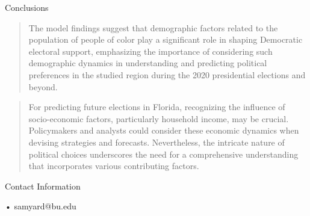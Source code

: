 \documentclass[xcolor=dvipsnames]{beamer}
\newlength{\onecolwid}
\begin{document}
\begin{frame}[t]
\begin{columns}[t]
\begin{column}{\onecolwid}

\begin{block}{Conclusions}\\
\begin{quote}
    The model findings suggest that demographic factors related to the population of people of color play a significant role in shaping Democratic electoral support, emphasizing the importance of considering such demographic dynamics in understanding and predicting political preferences in the studied region during the 2020 presidential elections and beyond.
\end{quote}
\newline
\begin{quote}
    For predicting future elections in Florida, recognizing the influence of socio-economic factors, particularly household income, may be crucial. Policymakers and analysts could consider these economic dynamics when devising strategies and forecasts. Nevertheless, the intricate nature of political choices underscores the need for a comprehensive understanding that incorporates various contributing factors.
\end{quote}

\end{block}





\begin{alertblock}{Contact Information}

 • samyard@bu.edu

\end{alertblock}


\end{column} %

\end{columns} %

\end{frame} %
\end{document}
